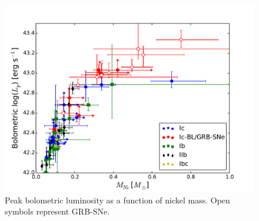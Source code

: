 \documentclass[a4paper,fleqn,usenatbib]{mnras}
\begin{document}
\begin{figure}
\centering
\includegraphics[scale=0.4]{Lp-v-Mni.pdf}
\caption{Peak bolometric luminosity as a function of nickel mass. Open symbols represent GRB-SNe.}
\label{fig:LpMni}
\end{figure}
\end{document}
